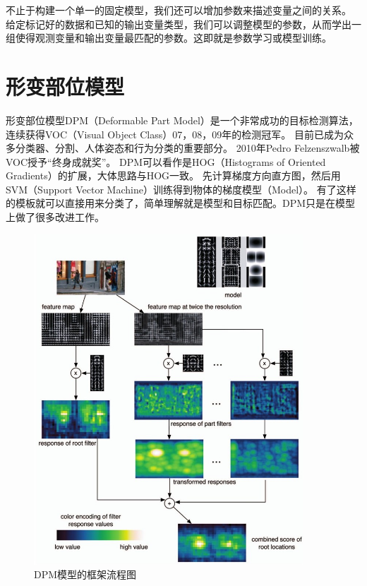 不止于构建一个单一的固定模型，我们还可以增加参数来描述变量之间的关系。
给定标记好的数据和已知的输出变量类型，我们可以调整模型的参数，从而学出一组使得观测变量和输出变量最匹配的参数。这即就是参数学习或模型训练。



\section{形变部位模型}
形变部位模型\cite{llsvm}DPM（Deformable Part Model）是一个非常成功的目标检测算法，
连续获得VOC（Visual Object Class）07，08，09年的检测冠军。
目前已成为众多分类器、分割、人体姿态和行为分类的重要部分。
2010年Pedro Felzenszwalb被VOC授予“终身成就奖”。
DPM可以看作是HOG（Histograms of Oriented Gradients）的扩展，大体思路与HOG一致。
先计算梯度方向直方图，然后用SVM（Support Vector Machine）训练得到物体的梯度模型（Model）。
有了这样的模板就可以直接用来分类了，简单理解就是模型和目标匹配。DPM只是在模型上做了很多改进工作。

\begin{figure}
\centering
\includegraphics[width=0.9\textwidth]{img/dpm.jpg}
\caption{DPM模型的框架流程图}
\label{fig:dpm}
\end{figure}

